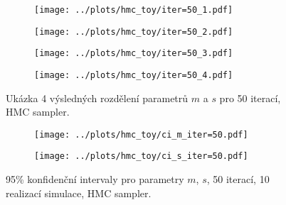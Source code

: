 \documentclass[11pt,oneside,american,czech]{article}
\begin{document}
\begin{figure}
	\centering
	\begin{subfigure}{0.45\textwidth}
		\centering
		\texttt{[image: ../plots/hmc\_toy/iter=50\_1.pdf]}
	\end{subfigure}
	\hspace{0.5cm}
	\begin{subfigure}{0.45\textwidth}
		\centering
		\texttt{[image: ../plots/hmc\_toy/iter=50\_2.pdf]}
	\end{subfigure}
	
	\vspace{2cm}
	
	\begin{subfigure}{0.45\textwidth}
		\centering
		\texttt{[image: ../plots/hmc\_toy/iter=50\_3.pdf]}
	\end{subfigure}
	\hspace{0.5cm}
	\begin{subfigure}{0.45\textwidth}
		\centering
		\texttt{[image: ../plots/hmc\_toy/iter=50\_4.pdf]}
	\end{subfigure}
	\caption{Ukázka 4 výsledných rozdělení parametrů $m$ a $s$ pro 50 iterací, HMC sampler.}
	\label{Obr: hmc toy 50}
\end{figure}

\begin{figure}
	\centering
	\begin{subfigure}{0.46\textwidth}
		\centering
		\texttt{[image: ../plots/hmc\_toy/ci\_m\_iter=50.pdf]}
	\end{subfigure}
	\hspace{0.5cm}
	\begin{subfigure}{0.46\textwidth}
		\centering
		\texttt{[image: ../plots/hmc\_toy/ci\_s\_iter=50.pdf]}
	\end{subfigure}
	\caption{95\% konfidenční intervaly pro parametry $m$, $s$, 50 iterací, 10 realizací simulace, HMC sampler.}
	\label{hmc toy 50 CI}
\end{figure}
\end{document}
